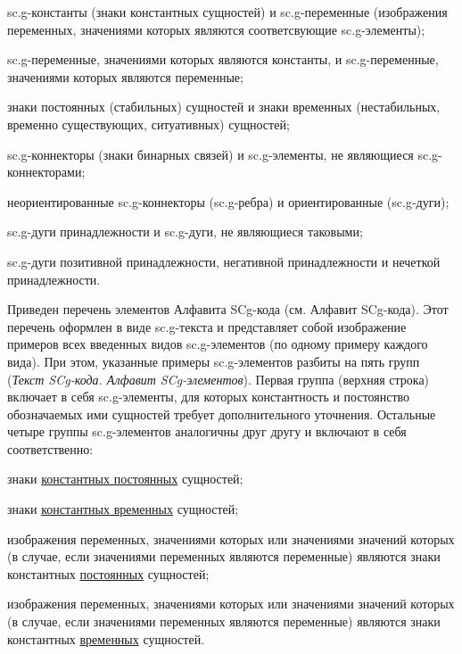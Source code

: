 \begin{SCn}
{\begin{scnitemize}
\item sc.g-константы (знаки константных сущностей) и sc.g-переменные (изображения переменных, значениями которых являются соответсвующие sc.g-элементы);
\item sc.g-переменные, значениями которых являются константы, и sc.g-переменные, значениями которых являются переменные;
\item знаки постоянных (стабильных) сущностей и знаки временных (нестабильных, временно существующих, ситуативных) сущностей;
\item sc.g-коннекторы (знаки бинарных связей) и sc.g-элементы, не являющиеся sc.g-коннекторами;
\item неориентированные sc.g-коннекторы (sc.g-ребра) и ориентированные (sc.g-дуги);
\item sc.g-дуги принадлежности и sc.g-дуги, не являющиеся таковыми;
\item sc.g-дуги позитивной принадлежности, негативной принадлежности и нечеткой принадлежности.
\end{scnitemize}

Приведен перечень элементов Алфавита SCg-кода (см. Алфавит SCg-кода).
Этот перечень оформлен в виде sc.g-текста и представляет собой изображение примеров всех введенных видов sc.g-элементов (по одному примеру каждого вида). При этом, указанные примеры sc.g-элементов разбиты на пять групп (\textit{Текст SCg-кода. Алфавит SCg-элементов}). Первая группа (верхняя строка) включает в себя sc.g-элементы, для которых константность и постоянство обозначаемых ими сущностей требует дополнительного уточнения. Остальные четыре группы sc.g-элементов аналогичны друг другу и включают в себя соответственно:

\begin{scnitemize}
\item знаки \uline{константных постоянных} сущностей;
\item знаки \uline{константных временных} сущностей;
\item изображения переменных, значениями которых или значениями значений которых (в случае, если значениями переменных являются переменные) являются знаки константных \uline{постоянных} сущностей;
\item изображения переменных, значениями которых или значениями значений которых (в случае, если значениями переменных являются переменные) являются знаки константных \uline{временных} сущностей.
\end{scnitemize}

}
\end{SCn}

